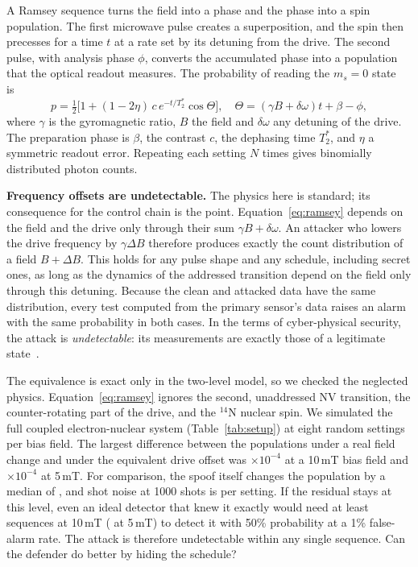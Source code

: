 \documentclass[conference,9pt]{IEEEtran}
\newcommand{\Ttwo}{T_2^{\ast}}
\begin{document}
A Ramsey sequence turns the field into a phase and the phase into a spin population. The first microwave pulse creates a superposition, and the spin then precesses for a time $t$ at a
rate set by its detuning from the drive. The second pulse, with analysis phase $\phi$, converts the
accumulated phase into a population that the optical readout measures. The probability of reading
the $m_s=0$ state is~\cite{degen2017quantum,rondin2014magnetometry}
\begin{equation}
 p=\tfrac12\bigl[1+(1-2\eta)\,c\,e^{-t/\Ttwo}\cos\Theta\bigr],\quad
 \Theta=(\gamma B+\delta\omega)t+\beta-\phi,
 \label{eq:ramsey}
\end{equation}
where $\gamma$ is the gyromagnetic ratio, $B$ the field and $\delta\omega$ any detuning of the drive.
The preparation phase is $\beta$, the contrast $c$, the dephasing time $\Ttwo$, and $\eta$ a symmetric
readout error. Repeating each setting $N$ times gives binomially distributed photon counts.

\textbf{Frequency offsets are undetectable.} The physics here is standard; its consequence for the
control chain is the point. Equation~\eqref{eq:ramsey} depends on the field and the drive only
through their sum $\gamma B+\delta\omega$. An attacker who lowers the drive
frequency by $\gamma\Delta B$ therefore produces exactly the count distribution of a field
$B+\Delta B$. This holds for any pulse shape and any schedule, including secret ones, as long as
the dynamics of the addressed transition depend on the field only through this detuning. Because
the clean and attacked data have the same distribution, every test computed from the primary
sensor's data raises an alarm with the same probability in both cases. In the terms of
cyber-physical security, the attack is \emph{undetectable}: its measurements are exactly those of a
legitimate state~\cite{pasqualetti2013attack}.

The equivalence is exact only in the two-level model, so we checked the neglected physics.
Equation~\eqref{eq:ramsey} ignores the second, unaddressed NV transition, the counter-rotating part
of the drive, and the $^{14}$N nuclear spin. We simulated the full coupled electron-nuclear system (Table~\ref{tab:setup}) at eight random
settings per bias field. The largest difference between the populations under a real field
change and under the equivalent drive offset was \SpinNominalDiff{}$\times10^{-4}$ at a 10\,mT bias
field and \SpinMaxDiff{}$\times10^{-4}$ at 5\,mT. For comparison, the spoof itself changes the
population by a median of \SpinSignal{}, and shot noise at 1000 shots is \SpinShotNoise{} per
setting. If the residual stays at this level, even an ideal detector that knew it exactly would
need at least \DetectSequencesNominal{} sequences at 10\,mT (\DetectSequencesWorst{} at 5\,mT) to
detect it with 50\% probability at a 1\% false-alarm rate. The attack is therefore undetectable
within any single sequence. Can the defender do better by hiding the schedule?
\end{document}
